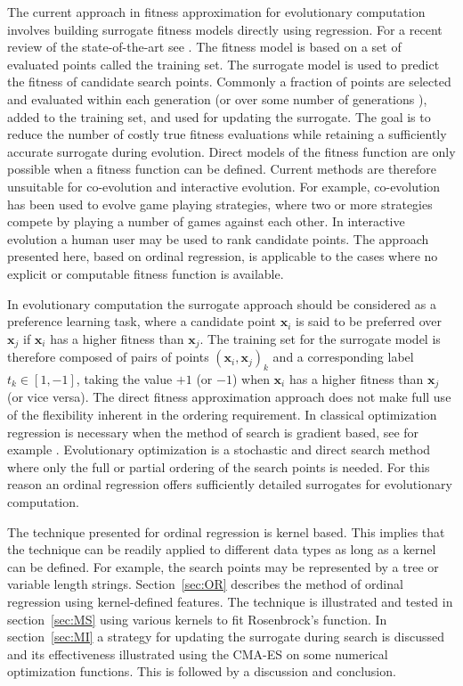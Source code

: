 \documentclass[10pt]{llncs}
\renewcommand{\vec}[1]{{\mbox{\boldmath$#1$}}}
\renewcommand{\vec}[1]{{\mathbf #1}}
\begin{document}
The current approach in fitness approximation for evolutionary
computation involves building surrogate fitness models directly
using regression.  For a recent review of the state-of-the-art
see \cite{Ong04,SLK05,Jin05}.  The fitness model is based on a
set of evaluated points called the training set. The surrogate
model is used to predict the fitness of candidate search points.
Commonly a fraction of points are selected and evaluated within
each generation (or over some number of generations
\cite{JOS02}), added to the training set, and used for updating
the surrogate.  The goal is to reduce the number of costly true
fitness evaluations while retaining a sufficiently accurate
surrogate during evolution. Direct models of the fitness
function are only possible when a fitness function can be
defined.  Current methods are therefore unsuitable for
co-evolution and interactive evolution.  For example,
co-evolution has been used to evolve game playing strategies,
where two or more strategies compete by playing a number of
games against each other.  In interactive evolution a human
user may be used to rank candidate points.  The approach
presented here, based on ordinal regression, is applicable to
the cases where no explicit or computable fitness function is
available.

In evolutionary computation the surrogate approach should be
considered as a preference learning task, where a candidate
point $\vec{x}_i$ is said to be preferred over $\vec{x}_j$ if
$\vec{x}_i$ has a higher fitness than $\vec{x}_j$. The training
set for the surrogate model is therefore composed of pairs of
points $(\vec{x}_i,\vec{x}_j)_k$ and a corresponding label
$t_k\in[1 ,-1]$, taking the value $+1$ (or $-1$) when
$\vec{x}_i$ has a higher fitness than $\vec{x}_j$ (or vice
versa).  The direct fitness approximation approach does not make
full use of the flexibility inherent in the ordering
requirement.  In classical optimization regression is necessary
when the method of search is gradient based, see for example
\cite{Madsen04}.  Evolutionary optimization is a stochastic and
direct search method where only the full or partial ordering of
the search points is needed.  For this reason an ordinal
regression offers sufficiently detailed surrogates for
evolutionary computation.

The technique presented for ordinal regression is kernel based.
This implies that the technique can be readily applied to
different data types as long as a kernel can be defined.  For
example, the search points may be represented by a tree or
variable length strings. Section~\ref{sec:OR} describes the
method of ordinal regression using kernel-defined features.  The
technique is illustrated and tested in section~\ref{sec:MS}
using various kernels to fit Rosenbrock's function. In
section~\ref{sec:MI} a strategy for updating the surrogate
during search is discussed and its effectiveness illustrated
using the CMA-ES \cite{hansen:ostermeier:01} on some numerical
optimization functions.  This is followed by a discussion 
and conclusion.
\end{document}
